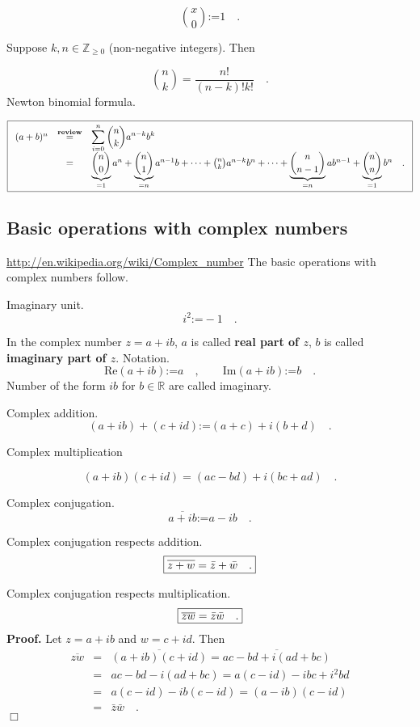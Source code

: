 \documentclass[12pt]{book}
\renewcommand{\Im}{\mathrm{Im}}
\renewcommand{\Re}{\mathrm{Re}}
\newcommand{\eqdef}{\textbf{:=}}
\newcommand{\eqReview}{\stackrel{\textbf{review}}{=}}
\newcommand{\importantFormula}[1]{\begin{equation} \boxed{#1} \end{equation}}
\newenvironment{proof}[1][]{ \textbf{Proof#1.} }{$\Box$\medskip}
\renewcommand{\emph}{\textbf}
\begin{document}
\[\binom{x}{0}\eqdef 1 \quad .
\]

Suppose $k,n\in \mathbb Z_{\geq 0}$ (non-negative integers). Then

\[\binom{n}{k} = \frac{n!}{(n-k)! k!}\quad .
\]
 Newton binomial formula.

\importantFormula{\label{eqNewtonBinomialFormula}
\begin{array}{rcl}
(a+b)^{n} &\eqReview&\displaystyle \sum\limits_{i=0}^n \binom {n}{k} a^{n-k}b^{k} \\&=& \underbrace{\binom{n}{0}}_{=1} a^n + \underbrace{\binom{n}{1}}_{=n}a^{n-1}b +\dots+ \binom{n}{k}a^{n-k}b^{n}+\dots + \underbrace{\binom{n}{n-1}}_{=n}ab^{n-1} + \underbrace{\binom{n}{n}}_{=1} b^n \quad .
\end{array}
}

\subsection{Basic operations with complex numbers}\label{secComplexNumbers}

\noindent \url{http://en.wikipedia.org/wiki/Complex_number}
\noindent The basic operations with complex numbers follow.

 Imaginary unit.
\[i^2\eqdef -1\quad .\]

In the complex number $z=a+ib$, $a$ is called \emph{real part of $z$}, $b$ is called \emph{imaginary part of $z$}. Notation.
\[
\Re (a+ib)\eqdef a \quad, \quad \quad \Im (a+ib)\eqdef b \quad .
\]
Number of the form $ib$ for $b\in \mathbb R$ are called imaginary.

Complex addition.
\[(a+i b)+ (c+id)\eqdef (a+c) + i(b+d) \quad .
\]

Complex multiplication 

\[
(a+ i b)(c+id)=(ac-bd)+i(bc+ad) \quad .
\]

 Complex conjugation.
\[\overline{a+ib}\eqdef a-ib \quad .
\]

Complex conjugation respects addition.
\importantFormula{
\label{eqComplexConjugationIsAddHMM} 
\overline {z +w}= \bar z +\bar w\quad .
}

Complex conjugation respects multiplication.
\importantFormula{
\label{eqComplexConjugationIsFieldHMM}  \overline {z w}= \bar z \bar w\quad .
}
\begin{proof}
Let $z= a+ib$ and $w=c+id$. Then
\begin{equation*}
\begin{array}{rcl}\overline {zw}&=& \overline{(a+ib)(c+id)}= \overline{ac-bd +i(ad+bc) }\\&=& ac-bd-i(ad+bc)= a(c-id)-ibc+i^{2}bd\\&=& a(c-id)-ib(c-id)= (a-ib)(c-id)\\&=&\bar z \bar w\quad .
\end{array}
\end{equation*}
\end{proof}
\end{document}
